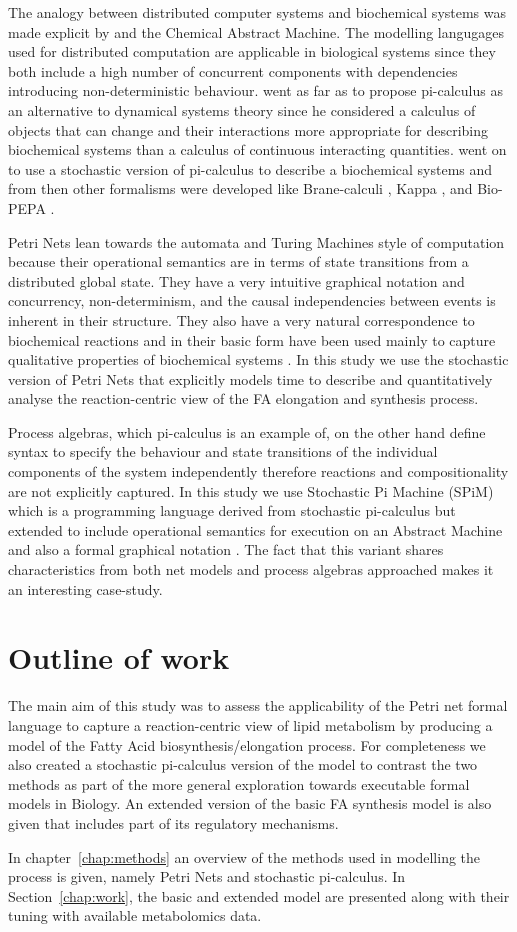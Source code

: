 The analogy between distributed computer systems and biochemical
systems was made explicit by \citet{berry1989chemical} and the
Chemical Abstract Machine. The modelling langugages used for
distributed computation are applicable in biological systems since
they both include a high number of concurrent components with dependencies
introducing non-deterministic behaviour. \citet{fontana1996barrier} went as far as
to propose pi-calculus as an alternative to dynamical systems
theory since he considered a calculus of objects that can change and their
interactions more appropriate for describing biochemical systems than a calculus of continuous
interacting quantities. \citet{priami2001application} went on to use a
stochastic version of pi-calculus to describe a biochemical systems
and from then other formalisms were developed like
Brane-calculi \cite [] {cardelli2005brane},
Kappa \cite [] {danos2004formal}, and
Bio-PEPA \cite [] {ciocchetta2009bio}.

Petri Nets lean towards the automata and Turing Machines style of
computation because their operational semantics are in terms of state
transitions from a distributed global state. They have a very intuitive
graphical notation and concurrency,
non-determinism, and the causal independencies between events is
inherent in their structure. They
also have a very natural correspondence to biochemical reactions and
in their basic form have been used mainly to capture qualitative properties
of biochemical systems \cite [] {baldan2010petri}. In this study we use the stochastic version of
Petri Nets that explicitly models time to describe and quantitatively
analyse the
reaction-centric view of the FA elongation and synthesis
process.

Process algebras, which pi-calculus is an example of, on the other
hand define syntax to specify the behaviour and state transitions of the individual
components of the system independently therefore reactions and
compositionality are not explicitly captured. In this study we
use Stochastic Pi Machine (SPiM) which is a programming
language derived from stochastic pi-calculus but extended to include
operational semantics for execution on an Abstract Machine and also a
formal graphical notation \cite [] {export:65224, export:65223}. The
fact that this variant shares
characteristics from both net models and process algebras approached
makes it an interesting case-study.

\section{Outline of work}
The main aim of this study was to assess the
applicability of the Petri net formal language to capture a
reaction-centric view of lipid metabolism by producing a model of the
Fatty Acid biosynthesis/elongation process. For completeness we also
created a stochastic pi-calculus version of the model to contrast the
two methods as part of the more general exploration towards executable
formal models in Biology. An extended version of the basic FA
synthesis model is
also given that includes part of its regulatory mechanisms.

In chapter~\ref{chap:methods} an overview of the methods used in
modelling the process is given, namely Petri Nets and stochastic
pi-calculus. In Section~\ref{chap:work}, the basic and extended model
are presented along with their tuning with available metabolomics
data. 

